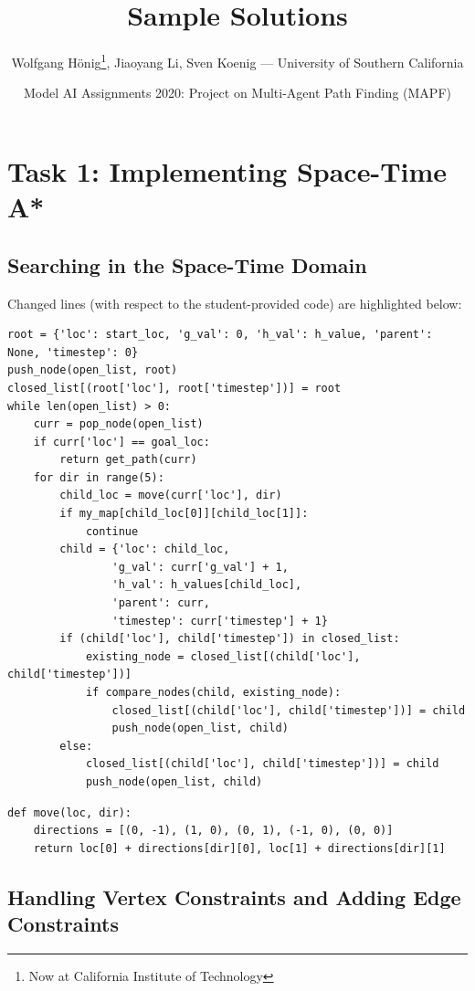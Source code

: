 \documentclass[11pt]{article}
\title{Sample Solutions}
\author{Wolfgang Hönig\footnote{Now at California Institute of Technology}, Jiaoyang Li, Sven Koenig --- University of Southern California}
\date{Model AI Assignments 2020: Project on Multi-Agent Path Finding (MAPF)}
\begin{document}
\maketitle

\section{Task 1: Implementing Space-Time A*}

\subsection{Searching in the Space-Time Domain}

Changed lines (with respect to the student-provided code) are highlighted below:

\begin{verbatim}
root = {'loc': start_loc, 'g_val': 0, 'h_val': h_value, 'parent': None, 'timestep': 0}
push_node(open_list, root)
closed_list[(root['loc'], root['timestep'])] = root
while len(open_list) > 0:
    curr = pop_node(open_list)
    if curr['loc'] == goal_loc:
        return get_path(curr)
    for dir in range(5):
        child_loc = move(curr['loc'], dir)
        if my_map[child_loc[0]][child_loc[1]]:
            continue
        child = {'loc': child_loc,
                'g_val': curr['g_val'] + 1,
                'h_val': h_values[child_loc],
                'parent': curr,
                'timestep': curr['timestep'] + 1}
        if (child['loc'], child['timestep']) in closed_list:
            existing_node = closed_list[(child['loc'], child['timestep'])]
            if compare_nodes(child, existing_node):
                closed_list[(child['loc'], child['timestep'])] = child
                push_node(open_list, child)
        else:
            closed_list[(child['loc'], child['timestep'])] = child
            push_node(open_list, child)
\end{verbatim}

\begin{verbatim}
def move(loc, dir):
    directions = [(0, -1), (1, 0), (0, 1), (-1, 0), (0, 0)]
    return loc[0] + directions[dir][0], loc[1] + directions[dir][1]
\end{verbatim}

\subsection{Handling Vertex Constraints and Adding Edge Constraints}
\end{document}
